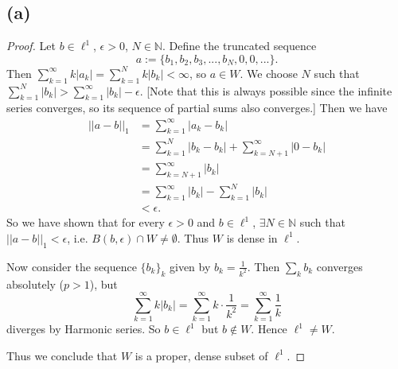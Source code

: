 \documentclass{article}
\begin{document}
\subsection*{(a)}
\begin{proof}
	Let $b \in \ell^1$, $\epsilon >0$, $N \in \mathbb{N}$. Define the truncated sequence
	\begin{equation}
		a := \{b_1, b_2, b_3, ..., b_N, 0, 0, ...\}.
	\end{equation}
	Then $\sum_{k=1}^{\infty}k |a_k| = \sum_{k=1}^N k |b_k| < \infty$, so $a\in W$. We choose $N$ such that $\sum_{k=1}^N |b_k| > \sum_{k=1}^{\infty}|b_k| - \epsilon$. [Note that this is always possible since the infinite series converges, so its sequence of partial sums also converges.] Then we have
	\begin{align}
		||a-b||_1 &= \sum_{k=1}^{\infty}|a_k - b_k| \\
		&= \sum_{k=1}^N|b_k - b_k| + \sum_{k=N+1}^{\infty}|0-b_k| \\
		&= \sum_{k=N+1}^{\infty}|b_k|\\
		&= \sum_{k=1}^{\infty} |b_k| - \sum_{k=1}^N |b_k|\\
		&< \epsilon.
	\end{align}
	So we have shown that for every $\epsilon > 0$ and $b \in \ell^1$, $\exists N \in \mathbb{N}$ such that $||a-b||_1 < \epsilon$, i.e. $B(b,\epsilon)\cap W \neq \emptyset$. Thus $W$ is dense in $\ell^1$.
	
	Now consider the sequence $\{b_k\}_k$ given by $b_k = \frac{1}{k^2}$. Then $\sum_k b_k$ converges absolutely ($p>1$), but 
	\begin{equation}
		\sum_{k=1}^{\infty}k |b_k| = \sum_{k=1}^{\infty}k\cdot \frac{1}{k^2} = \sum_{k=1}^{\infty}\frac{1}{k}
	\end{equation}
	diverges by Harmonic series. So $b\in \ell^1$ but $b\notin W$. Hence $\ell^1 \neq W$.
	
	Thus we conclude that $W$ is a proper, dense subset of $\ell^1$.
\end{proof}
\end{document}
